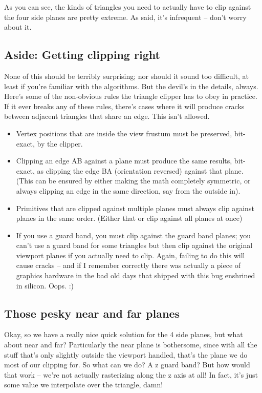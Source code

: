 \documentclass[12pt]{article}
\begin{document}
As you can see, the kinds of triangles you need to actually have to clip against the four side planes are pretty extreme. As said, it’s infrequent – don’t worry about it.

\subsection{Aside: Getting clipping right}
\label{sec:org83b6ec8}

None of this should be terribly surprising; nor should it sound too difficult, at least if you’re familiar with the algorithms. But the devil’s in the details, always. Here’s some of the non-obvious rules the triangle clipper has to obey in practice. If it ever breaks any of these rules, there’s cases where it will produce cracks between adjacent triangles that share an edge. This isn’t allowed.

\begin{itemize}
\item Vertex positions that are inside the view frustum must be preserved, bit-exact, by the clipper.
\item Clipping an edge AB against a plane must produce the same results, bit-exact, as clipping the edge BA (orientation reversed) against that plane. (This can be ensured by either making the math completely symmetric, or always clipping an edge in the same direction, say from the outside in).
\item Primitives that are clipped against multiple planes must always clip against planes in the same order. (Either that or clip against all planes at once)
\item If you use a guard band, you must clip against the guard band planes; you can’t use a guard band for some triangles but then clip against the original viewport planes if you actually need to clip. Again, failing to do this will cause cracks – and if I remember correctly there was actually a piece of graphics hardware in the bad old days that shipped with this bug enshrined in silicon. Oops. :)
\end{itemize}

\subsection{Those pesky near and far planes}
\label{sec:orgd5d665b}

Okay, so we have a really nice quick solution for the 4 side planes, but what about near and far? Particularly the near plane is bothersome, since with all the stuff that’s only slightly outside the viewport handled, that’s the plane we do most of our clipping for. So what can we do? A z guard band? But how would that work – we’re not actually rasterizing along the z axis at all! In fact, it’s just some value we interpolate over the triangle, damn!
\end{document}
